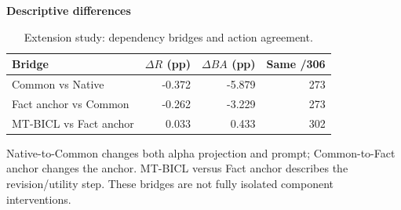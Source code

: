 \begin{table}[p]
\centering\small
\setlength{\tabcolsep}{3pt}
\renewcommand{\arraystretch}{1.12}
\caption{Extension study: dependency bridges and action agreement.}
\label{tab:u09-bridge}
\textbf{Descriptive differences}\par\smallskip
\begin{tabular}{lrrr}
\hline
Bridge & $\Delta R$ (pp) & $\Delta BA$ (pp) & Same /306 \\
\hline
Common vs Native & -0.372 & -5.879 & 273 \\
Fact anchor vs Common & -0.262 & -3.229 & 273 \\
MT-BICL vs Fact anchor & 0.033 & 0.433 & 302 \\
\hline
\end{tabular}\par\medskip
\begin{minipage}{\textwidth}\footnotesize Native-to-Common changes both alpha projection and prompt; Common-to-Fact anchor changes the anchor. MT-BICL versus Fact anchor describes the revision/utility step. These bridges are not fully isolated component interventions.\end{minipage}
\end{table}
